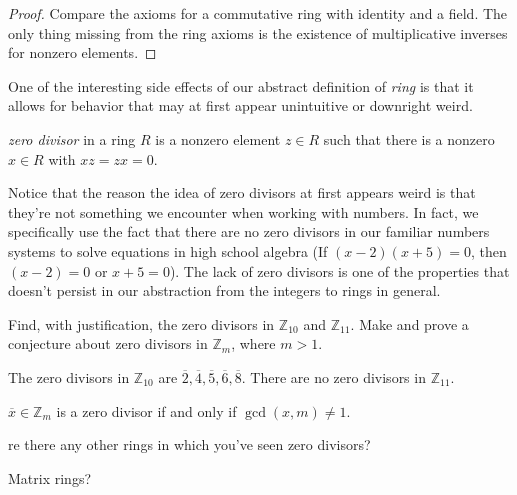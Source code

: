 \documentclass[english,course]{lecture}
\newenvironment{solution}[1][Solution]{\begin{trivlist}\pushQED{\qed}\item[\hskip \labelsep  \bfseries #1{}.\hspace{10pt}]}{\popQED\end{trivlist}}\renewcommand{\qedsymbol}{$\checkmark$}{\newenvironment{answer}{\renewcommand\qedsymbol{$\blacklozenge$}\begin{proof}[Answer]}{\end{proof}}}\newenvironment{answer}[1][Answer]{\begin{trivlist}\pushQED{\qed}\item[\hskip \labelsep  \bfseries #1{}.\hspace{10pt}]}{\popQED\end{trivlist}}\renewcommand{\qedsymbol}{$\lozenge$}
\theoremstyle{plain}
\newenvironment{question}[1]
  {\renewcommand\theinnerquestion{#1}\innerquestion}
  {\endinnerquestion}
\newenvironment{definition}[1]
  {\renewcommand\theinnerdefinition{#1}\innerdefinition}
  {\endinnerdefinition}
\def\Z{{\mathbb Z}}
\def\presnotes{}
\begin{document}
\begin{proof}
	Compare the axioms for a commutative ring with identity and a field.
	The only thing missing from the ring axioms is the existence of multiplicative inverses for nonzero elements.
\end{proof}

\presnotes

One of the interesting side effects of our abstract definition of \emph{ring} is that it allows for behavior that may at first appear unintuitive or downright weird.

\begin{definition}
	A \emph{zero divisor} in a ring $R$ is a nonzero element $z\in R$ such that there is a nonzero $x\in R$ with $xz = zx = 0$.
\end{definition}

Notice that the reason the idea of zero divisors at first appears weird is that they're not something we encounter when working with numbers. In fact, we specifically use the fact that there are no zero divisors in our familiar numbers systems to solve equations in high school algebra (If $(x-2)(x+5)=0$, then $(x-2)=0$ or $x+5=0$). The lack of zero divisors is one of the properties that doesn't persist in our abstraction from the integers to rings in general.

\begin{exer}
	Find, with justification, the zero divisors in $\Z_{10}$ and $\Z_{11}$.
	Make and prove a conjecture about zero divisors in $\Z_m$, where $m > 1$.
\end{exer}

\begin{solution}
	The zero divisors in $\Z_{10}$ are $\overline{2}, \overline{4}, \overline{5}, \overline{6},\overline{8}$.
	There are no zero divisors in $\Z_{11}$.

\medskip 

 $\overline{x}\in \Z_m$ is a zero divisor if and only if $\gcd(x,m) \ne 1$.
\end{solution}

\presnotes

\begin{question}
	Are there any other rings in which you've seen zero divisors?
\end{question}

\begin{answer}
	Matrix rings?
\end{answer}

\presnotes
\end{document}
